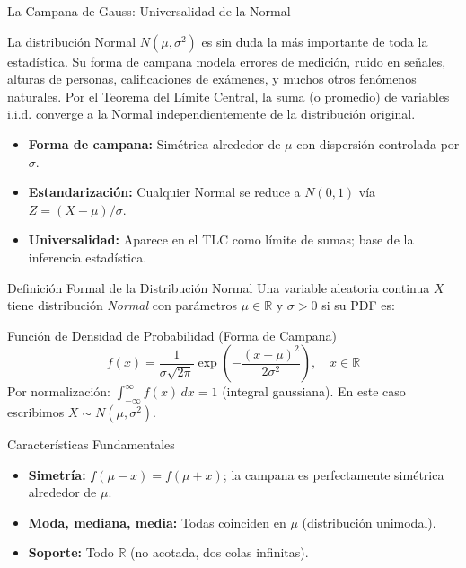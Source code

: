 \documentclass[10pt, aspectratio=169]{beamer}
\begin{document}
\begin{frame}{La Campana de Gauss: Universalidad de la Normal}
  \footnotesize
  \begin{motivacion}
    La distribución Normal $N(\mu, \sigma^{2})$ es sin duda la más importante de toda la estadística. Su forma de campana modela errores de medición, ruido en señales, alturas de personas, calificaciones de exámenes, y muchos otros fenómenos naturales. Por el Teorema del Límite Central, la suma (o promedio) de variables i.i.d. converge a la Normal independientemente de la distribución original.
  \end{motivacion}

  \vspace{0.15cm}
  \pause
  \begin{itemize}\itemsep=0.1cm
    \item \textbf{Forma de campana:} Simétrica alrededor de $\mu$ con dispersión controlada por $\sigma$. \pause
    \item \textbf{Estandarización:} Cualquier Normal se reduce a $N(0, 1)$ vía $Z = (X - \mu)/\sigma$. \pause
    \item \textbf{Universalidad:} Aparece en el TLC como límite de sumas; base de la inferencia estadística.
  \end{itemize}
\end{frame}

\begin{frame}{Definición Formal de la Distribución Normal}
  \footnotesize
  Una variable aleatoria continua $X$ tiene distribución \emph{Normal} con parámetros $\mu \in \mathbb{R}$ y $\sigma > 0$ si su PDF es: \pause

  \vspace{0.1cm}
  \begin{block}{Función de Densidad de Probabilidad (Forma de Campana)}
    $$f(x) = \dfrac{1}{\sigma\sqrt{2\pi}} \exp\left(-\dfrac{(x - \mu)^{2}}{2\sigma^{2}}\right), \quad x \in \mathbb{R}$$
    Por normalización: $\int_{-\infty}^{\infty} f(x)\,dx = 1$ (integral gaussiana). En este caso escribimos $X \sim N(\mu, \sigma^{2})$.
  \end{block}

  \vspace{0.1cm}
  \pause
  \begin{alertblock}{Características Fundamentales}
    \begin{itemize}\itemsep=0.05cm
      \item \textbf{Simetría:} $f(\mu - x) = f(\mu + x)$; la campana es perfectamente simétrica alrededor de $\mu$.
      \item \textbf{Moda, mediana, media:} Todas coinciden en $\mu$ (distribución unimodal).
      \item \textbf{Soporte:} Todo $\mathbb{R}$ (no acotada, dos colas infinitas).
    \end{itemize}
  \end{alertblock}
\end{frame}
\end{document}
